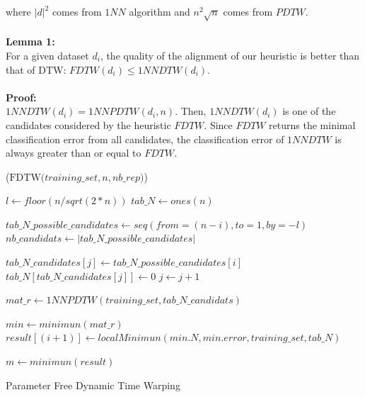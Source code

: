 where $|d|^{2}$ comes from $1NN$ algorithm and
$n^{2}\sqrt{n}$ comes from $PDTW$. 



\paragraph{}\textbf{Lemma 1: } \\
For a given dataset $d_i$, the quality of the alignment of our heuristic
is better than that of DTW: $ FDTW(d_{i}) \leq 1NNDTW(d_{i}) $.


\paragraph{}\textbf{Proof: } \\
 $1NNDTW(d_i) = 1NNPDTW(d_i,n)$. Then, $1NNDTW(d_i)$ is one of the
candidates considered by the heuristic $FDTW$. Since $FDTW$ returns the
minimal classification error from all candidates, the classification error of
$1NNDTW$ is always greater than or equal to $FDTW$.



\begin{algorithm}[h]
\DontPrintSemicolon
{}

\Begin($\text{FDTW} {(} training\_set, n, nb\_rep {)}$)
{
  $l \leftarrow floor(n/sqrt(2 * n))$\;
  $tab\_N \leftarrow ones(n)$\;
  {
    $tab\_N\_possible\_candidates \leftarrow seq(from = (n - i), to = 1, by = -l)$\;
    $nb\_candidats \leftarrow |tab\_N\_possible\_candidates|$\;

    {
      {
       $tab\_N\_candidates[j] \leftarrow tab\_N\_possible\_candidates[i] $\;
       $tab\_N[ tab\_N\_candidates[j] ] \leftarrow 0 $\;
       $j \leftarrow j + 1$
      }

    }
    $mat\_r \leftarrow 1NNPDTW(training\_set, tab\_N\_candidats)$ \;

    $min \leftarrow minimun(mat\_r) $\;
    $result[(i + 1)]   \leftarrow localMinimun(min.N,  min.error, training\_set,
    tab\_N)$\;
      
  }
  $m \leftarrow minimun(result)$\;
    

}
\caption{Parameter Free Dynamic Time Warping}\label{algo5}
\end{algorithm}


